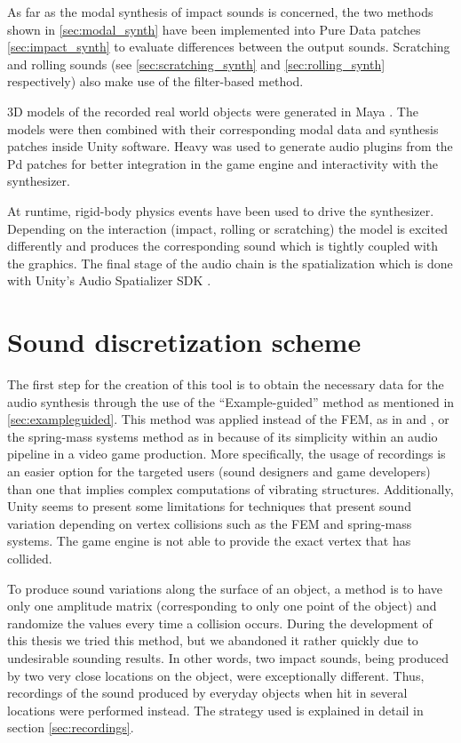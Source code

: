 As far as the modal synthesis of impact sounds is concerned, the two methods shown in \ref{sec:modal_synth} have been implemented into Pure Data patches \ref{sec:impact_synth} to evaluate differences between the output sounds. Scratching and rolling sounds (see \ref{sec:scratching_synth} and \ref{sec:rolling_synth} respectively) also make use of the filter-based method.

3D models of the recorded real world objects were generated in Maya \cite{bib:maya}. The models were then combined with their corresponding modal data and synthesis patches inside Unity\textsuperscript{\textregistered} software. Heavy was used to generate audio plugins from the Pd patches for better integration in the game engine and interactivity with the synthesizer. 

At runtime, rigid-body physics events have been used to drive the synthesizer. Depending on the interaction (impact, rolling or scratching) the model is excited differently and produces the corresponding sound which is tightly coupled with the graphics. The final stage of the audio chain is the spatialization which is done with Unity's Audio Spatializer SDK \cite{bib:unity_doc}.

\section{Sound discretization scheme}\label{discretization}

The first step for the creation of this tool is to obtain the necessary data for the audio synthesis through the use of the ``Example-guided'' method as mentioned in \ref{sec:exampleguided}. This method was applied instead of the \gls{FEM}, as in \cite{director2001synthesizing} and \cite{o2002synthesizing}, or the spring-mass systems method as in \cite{raghuvanshi2006interactive} because of its simplicity within an audio pipeline in a video game production. More specifically, the usage of recordings is an easier option for the targeted users (sound designers and game developers) than one that implies complex computations of vibrating structures. Additionally, Unity\textsuperscript{\textregistered} seems to present some limitations for techniques that present sound variation depending on vertex collisions such as the \gls{FEM} and spring-mass systems. The game engine is not able to provide the exact vertex that has collided. 

To produce sound variations along the surface of an object, a method is to have only one amplitude matrix (corresponding to only one point of the object) and randomize the values every time a collision occurs. During the development of this thesis we tried this method, but we abandoned it rather quickly due to undesirable sounding results. In other words, two impact sounds, being produced by two very close locations on the object, were exceptionally different. Thus, recordings of the sound produced by everyday objects when hit in several locations were performed instead. The strategy used is explained in detail in section \ref{sec:recordings}.

